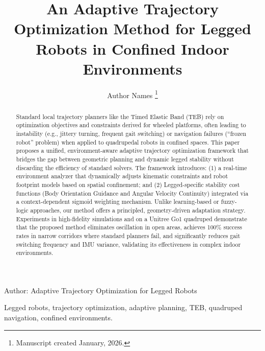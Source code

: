 \documentclass[lettersize,journal]{IEEEtran}
\begin{document}
\title{An Adaptive Trajectory Optimization Method for Legged Robots in Confined Indoor Environments}
\author{Author Names
\thanks{Manuscript created January, 2026.}}

%
{Author: Adaptive Trajectory Optimization for Legged Robots}

\maketitle

\begin{abstract}
Standard local trajectory planners like the Timed Elastic Band (TEB) rely on optimization objectives and constraints derived for wheeled platforms, often leading to instability (e.g., jittery turning, frequent gait switching) or navigation failures (``frozen robot'' problem) when applied to quadrupedal robots in confined spaces. This paper proposes a unified, environment-aware adaptive trajectory optimization framework that bridges the gap between geometric planning and dynamic legged stability without discarding the efficiency of standard solvers. The framework introduces: (1) a real-time environment analyzer that dynamically adjusts kinematic constraints and robot footprint models based on spatial confinement; and (2) Legged-specific stability cost functions (Body Orientation Guidance and Angular Velocity Continuity) integrated via a context-dependent sigmoid weighting mechanism. Unlike learning-based or fuzzy-logic approaches, our method offers a principled, geometry-driven adaptation strategy. Experiments in high-fidelity simulations and on a Unitree Go1 quadruped demonstrate that the proposed method eliminates oscillation in open areas, achieves 100\% success rates in narrow corridors where standard planners fail, and significantly reduces gait switching frequency and IMU variance, validating its effectiveness in complex indoor environments.
\end{abstract}

\begin{IEEEkeywords}
Legged robots, trajectory optimization, adaptive planning, TEB, quadruped navigation, confined environments.
\end{IEEEkeywords}
\end{document}
